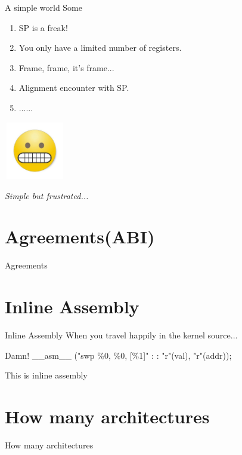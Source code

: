 \documentclass[UKenglish]{beamer}
\begin{document}
\begin{frame}{A simple world}
  Some \color{red}{caveat}
  \begin{enumerate}
  \item SP is a freak!
  \item You only have a limited number of registers.
  \item Frame, frame, it's frame...
  \item Alignment encounter with SP.
  \item ......
  \end{enumerate}
  \begin{center}
    \includegraphics[width = 0.2\textwidth, height=2.5cm]{grimace.jpg}
  \end{center}
  \begin{center}
    \Large \emph{Simple but frustrated...}
  \end{center}
\end{frame}

\section{Agreements(ABI)}
\begin{frame}{Agreements}
  
\end{frame}

\section{Inline Assembly}
\begin{frame}{Inline Assembly}
  When you travel happily in the kernel source...
  \begin{alertblock}{Damn!}
    \_\_asm\_\_ ("swp \%0, \%0, [\%1]" : : "r"(val), "r"(addr));
  \end{alertblock}
  This is inline assembly
  
\end{frame}

\section{How many architectures}
\begin{frame}{How many architectures}
  
\end{frame}
\end{document}
